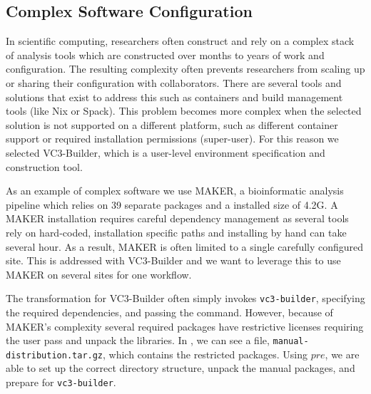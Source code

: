 \documentclass[conference]{IEEEtran}
\begin{document}
\subsection{Complex Software Configuration}

In scientific computing, researchers often construct
and rely on a complex stack of analysis tools
which are constructed over
months to years of work and configuration.
The resulting complexity often prevents researchers from
scaling up or sharing their configuration with
collaborators.
There are several tools and solutions that exist
to address this such as containers and build management
tools (like Nix\cite{Dolstra:2004:NSP:1052676.1052686} or 
Spack\cite{Gamblin:2015:SPM:2807591.2807623}).
This problem becomes more complex when the selected
solution is not supported on a different platform,
such as different container support or
required installation permissions (super-user).
For this reason we selected VC3-Builder\cite{tovar-ic2e-2018},
which is a user-level environment specification
and construction tool.

As an example of complex software we use MAKER\cite{pmid18025269},
a bioinformatic analysis pipeline which relies
on 39 separate packages and a installed size of 4.2G.
A MAKER installation requires careful
dependency management as several tools rely
on hard-coded, installation specific paths
and installing by hand can take several hour.
As a result, MAKER is often limited to a single
carefully configured site.
This is addressed with VC3-Builder and
we want to leverage this to use MAKER 
on several sites for one workflow.

The transformation for VC3-Builder often
simply invokes {\tt vc3-builder},
specifying the required dependencies,
and passing the command.
However, because of MAKER's complexity several
required packages have restrictive licenses
requiring the user 
pass and unpack the libraries.
In , we can see a file,
{\tt manual-distribution.tar.gz}, which
contains the restricted packages.
Using $pre$, we are able to set up the
correct directory structure,
unpack the manual packages,
and prepare for {\tt vc3-builder}.
\end{document}
